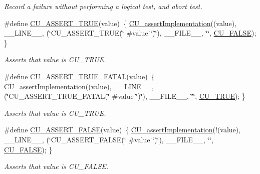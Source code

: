 \begin{DoxyCompactItemize}
\begin{DoxyCompactList}\small\item\em Record a failure without performing a logical test, and abort test. \end{DoxyCompactList}\item 
\#define \hyperlink{group___framework_ga747d6e9d7ae9eb15091f923a69c19bfc}{C\+U\+\_\+\+A\+S\+S\+E\+R\+T\+\_\+\+T\+R\+U\+E}(value)~\{ \hyperlink{group___framework_gad409fc536d9d3fb5f659c76421e8ce3b}{C\+U\+\_\+assert\+Implementation}((value), \+\_\+\+\_\+\+L\+I\+N\+E\+\_\+\+\_\+, (\char`\"{}C\+U\+\_\+\+A\+S\+S\+E\+R\+T\+\_\+\+T\+R\+U\+E(\char`\"{} \#value \char`\"{})\char`\"{}), \+\_\+\+\_\+\+F\+I\+L\+E\+\_\+\+\_\+, \char`\"{}\char`\"{}, \hyperlink{group___framework_ga7453214541b156ef868681eaafe60860}{C\+U\+\_\+\+F\+A\+L\+S\+E}); \}
\begin{DoxyCompactList}\small\item\em Asserts that value is C\+U\+\_\+\+T\+R\+U\+E. \end{DoxyCompactList}\item 
\#define \hyperlink{group___framework_ga86beba3f4f6c14fbd8a6ac4fd106740d}{C\+U\+\_\+\+A\+S\+S\+E\+R\+T\+\_\+\+T\+R\+U\+E\+\_\+\+F\+A\+T\+A\+L}(value)~\{ \hyperlink{group___framework_gad409fc536d9d3fb5f659c76421e8ce3b}{C\+U\+\_\+assert\+Implementation}((value), \+\_\+\+\_\+\+L\+I\+N\+E\+\_\+\+\_\+, (\char`\"{}C\+U\+\_\+\+A\+S\+S\+E\+R\+T\+\_\+\+T\+R\+U\+E\+\_\+\+F\+A\+T\+A\+L(\char`\"{} \#value \char`\"{})\char`\"{}), \+\_\+\+\_\+\+F\+I\+L\+E\+\_\+\+\_\+, \char`\"{}\char`\"{}, \hyperlink{group___framework_ga99641394bc766ca9c4a295e942fed1ef}{C\+U\+\_\+\+T\+R\+U\+E}); \}
\begin{DoxyCompactList}\small\item\em Asserts that value is C\+U\+\_\+\+T\+R\+U\+E. \end{DoxyCompactList}\item 
\#define \hyperlink{group___framework_ga0f74cb3f0a6d4393e4ffeb541b14ee38}{C\+U\+\_\+\+A\+S\+S\+E\+R\+T\+\_\+\+F\+A\+L\+S\+E}(value)~\{ \hyperlink{group___framework_gad409fc536d9d3fb5f659c76421e8ce3b}{C\+U\+\_\+assert\+Implementation}(!(value), \+\_\+\+\_\+\+L\+I\+N\+E\+\_\+\+\_\+, (\char`\"{}C\+U\+\_\+\+A\+S\+S\+E\+R\+T\+\_\+\+F\+A\+L\+S\+E(\char`\"{} \#value \char`\"{})\char`\"{}), \+\_\+\+\_\+\+F\+I\+L\+E\+\_\+\+\_\+, \char`\"{}\char`\"{}, \hyperlink{group___framework_ga7453214541b156ef868681eaafe60860}{C\+U\+\_\+\+F\+A\+L\+S\+E}); \}
\begin{DoxyCompactList}\small\item\em Asserts that value is C\+U\+\_\+\+F\+A\+L\+S\+E. \end{DoxyCompactList}\item 

\end{DoxyCompactItemize}
